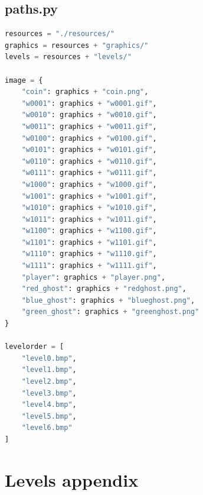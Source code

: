 \documentclass[11pt,a4paper,notitlepage]{report}
\begin{document}
		\section{paths.py}
			\begin{lstlisting}[language = Python]
resources = "./resources/"
graphics = resources + "graphics/"
levels = resources + "levels/"

image = {
	"coin": graphics + "coin.png",
	"w0001": graphics + "w0001.gif",
	"w0010": graphics + "w0010.gif",
	"w0011": graphics + "w0011.gif",
	"w0100": graphics + "w0100.gif",
	"w0101": graphics + "w0101.gif",
	"w0110": graphics + "w0110.gif",
	"w0111": graphics + "w0111.gif",
	"w1000": graphics + "w1000.gif",
	"w1001": graphics + "w1001.gif",
	"w1010": graphics + "w1010.gif",
	"w1011": graphics + "w1011.gif",
	"w1100": graphics + "w1100.gif",
	"w1101": graphics + "w1101.gif",
	"w1110": graphics + "w1110.gif",
	"w1111": graphics + "w1111.gif",
	"player": graphics + "player.png",
	"red_ghost": graphics + "redghost.png",
	"blue_ghost": graphics + "blueghost.png",
	"green_ghost": graphics + "greenghost.png"
}

levelorder = [
	"level0.bmp",
	"level1.bmp",
	"level2.bmp",
	"level3.bmp",
	"level4.bmp",
	"level5.bmp",
	"level6.bmp"
]
			\end{lstlisting}
	\chapter{Levels appendix}
		\newpage
\end{document}
